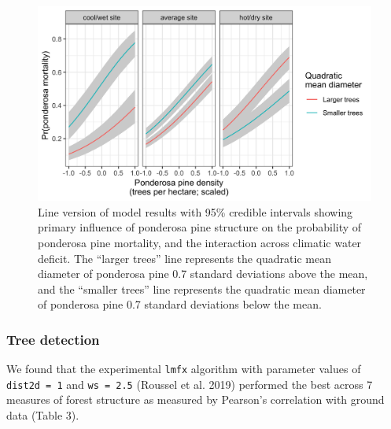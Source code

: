 \documentclass[]{article}
\begin{document}
\begin{figure}
\centering
\includegraphics{../../figures/pipo_tpha_qmd_cwd_interaction.png}
\caption{Line version of model results with 95\% credible intervals
showing primary influence of ponderosa pine structure on the probability
of ponderosa pine mortality, and the interaction across climatic water
deficit. The ``larger trees'' line represents the quadratic mean
diameter of ponderosa pine 0.7 standard deviations above the mean, and
the ``smaller trees'' line represents the quadratic mean diameter of
ponderosa pine 0.7 standard deviations below the mean.}
\end{figure}

\subsubsection{Tree detection}\label{tree-detection-1}

We found that the experimental \texttt{lmfx} algorithm with parameter
values of \texttt{dist2d\ =\ 1} and \texttt{ws\ =\ 2.5} (Roussel et al.
2019) performed the best across 7 measures of forest structure as
measured by Pearson's correlation with ground data (Table 3).
\end{document}
